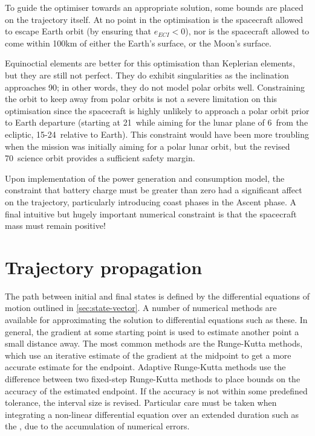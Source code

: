 To guide the optimiser towards an appropriate solution, some bounds are placed on the trajectory itself. At no point in the optimisation is the spacecraft allowed to escape Earth orbit (by ensuring that $e_{ECI}<0$), nor is the spacecraft allowed to come within 100km of either the Earth's surface, or the Moon's surface.

Equinoctial elements are better for this optimisation than Keplerian elements, but they are still not perfect. They do exhibit singularities as the inclination approaches 90\degrees; in other words, they do not model polar orbits well. Constraining the orbit to keep away from polar orbits is not a severe limitation on this optimisation since the spacecraft is highly unlikely to approach a polar orbit prior to Earth departure (starting at 21\degrees\ while aiming for the lunar plane of 6\degrees\ from the ecliptic, 15-24\degrees\ relative to Earth). This constraint would have been more troubling when the mission was initially aiming for a polar lunar orbit, but the revised 70\degrees\ science orbit provides a sufficient safety margin.

Upon implementation of the power generation and consumption model, the constraint that battery charge must be greater than zero had a significant affect on the trajectory, particularly introducing coast phases in the Ascent phase. A final intuitive but hugely important numerical constraint is that the spacecraft mass must remain positive! 


\section{Trajectory propagation}
The path between initial and final states is defined by the differential equations of motion outlined in \autoref{sec:state-vector}. A number of numerical methods are available for approximating the solution to differential equations such as these. In general, the gradient at some starting point is used to estimate another point a small distance away. The most common methods are the Runge-Kutta methods, which use an iterative estimate of the gradient at the midpoint to get a more accurate estimate for the endpoint. Adaptive Runge-Kutta methods use the difference between two fixed-step Runge-Kutta methods to place bounds on the accuracy of the estimated endpoint. If the accuracy is not within some predefined tolerance, the interval size is revised. Particular care must be taken when integrating a non-linear differential equation over an extended duration such as the \BW, due to the accumulation of numerical errors.

